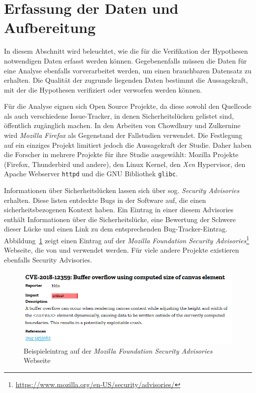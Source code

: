 \section{Erfassung der Daten und Aufbereitung}
\label{sec:erfassung}
In diesem Abschnitt wird beleuchtet, wie die für die Verifikation der Hypothesen notwendigen Daten erfasst werden können.
Gegebenenfalls müssen die Daten für eine Analyse ebenfalls vorverarbeitet werden, um einen brauchbaren Datensatz zu erhalten.
Die Qualität der zugrunde liegenden Daten bestimmt die Aussagekraft, mit der die Hypothesen verifiziert oder verworfen werden können.

Für die Analyse eignen sich Open Source Projekte,
da diese sowohl den Quellcode als auch verschiedene Issue-Tracker,
in denen Sicherheitslücken gelistet sind,
öffentlich zugänglich machen.
In den Arbeiten von Chowdhury und Zulkernine\cite{chowdhury_zulkernine_2010,chowdhury_zulkernine_2009} wird \emph{Mozilla Firefox} als Gegenstand der Fallstudien verwendet.
Die Festlegung auf ein einziges Projekt limitiert jedoch die Aussagekraft der Studie.
Daher haben die Forscher in \cite{alves_et_al} mehrere Projekte für ihre Studie ausgewählt: 
Mozilla Projekte (Firefox, Thunderbird und andere),
den Linux Kernel,
den \emph{Xen} Hypervisor,
den Apache Webserver \texttt{httpd} und
die GNU Bibliothek \texttt{glibc}.

Informationen über Sicherheitslücken lassen sich über sog. \emph{Security Advisories} erhalten.
Diese listen entdeckte Bugs in der Software auf, die einen sicherheitsbezogenen Kontext haben.
Ein Eintrag in einer diesem Advisories enthält Informationen über die Sicherheitslücke, eine Bewertung der Schwere dieser Lücke und einen Link zu dem entsprechenden Bug-Tracker-Eintrag.
Abbildung~\ref{fig:mfsa} zeigt einen Eintrag auf der \textit{Mozilla Foundation Security Advisories}\footnote{\url{https://www.mozilla.org/en-US/security/advisories/}} Webseite, die von \cite{alves_et_al} und \cite{chowdhury_zulkernine_2010} verwendet werden.
Für viele andere Projekte existieren ebenfalls Security Advisories.
\begin{figure}
	\includegraphics[width=\textwidth]{img/mfsa_example.png}
	\caption{Beispieleintrag auf der \textit{Mozilla Foundation Security Advisories} Webseite}
	\label{fig:mfsa}
\end{figure}

